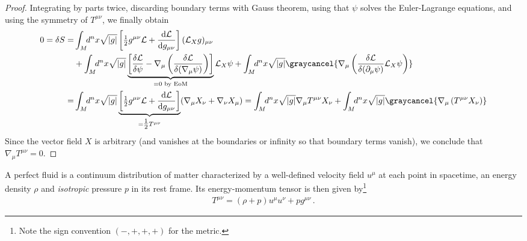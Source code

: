 \begin{proof}
Integrating by parts twice, discarding boundary terms with Gauss theorem, using that $\psi$ solves the Euler-Lagrange equations, and using the symmetry of $T^{\mu\nu}$, we finally obtain
{\small
\begin{align}
0= \delta S = & \int_M \!\!d^nx \sqrt{|g|} \left[ \tfrac{1}{2} g^{\mu\nu} \mathcal{L} + \frac{\mathrm{d} \mathcal{L}}{\mathrm{d} g_{\mu\nu}} \right] (\mathcal{L}_X g)_{\mu\nu}
\\
&+ \int_M \!\!d^nx \sqrt{|g|} \underbrace{\left[ \frac{\delta \mathcal{L}}{\delta \psi} - \nabla_\mu \left( \frac{\delta \mathcal{L}}{\delta (\nabla_\mu \psi)} \right) \right]}_{=0 \text{ by EoM}} \mathcal{L}_X \psi + \int_M \!\!d^nx \sqrt{|g|} \graycancel{\nabla_\mu \left( \frac{\delta \mathcal{L}}{\delta (\partial_\mu \psi)} \mathcal{L}_X \psi \right)}
\\
=& \int_M \!\!d^nx \sqrt{|g|} \underbrace{\left[ \tfrac{1}{2} g^{\mu\nu} \mathcal{L} + \frac{\mathrm{d}\mathcal{L}}{\mathrm{d} g_{\mu\nu}} \right]}_{=\tfrac{1}{2}T^{\mu\nu}} (\nabla_\mu X_\nu + \nabla_\nu X_\mu)
= \int_M\!\! d^nx \sqrt{|g|} \nabla_{\mu}T^{\mu\nu} X_\nu 
+ \int_M \!\!d^nx \sqrt{|g|} \graycancel{\nabla_{\mu}\left(T^{\mu\nu}X_\nu\right)}
\end{align}
}
Since the vector field $X$ is arbitrary (and vanishes at the boundaries or infinity so that boundary terms vanish), we conclude that $\nabla_\mu T^{\mu\nu}=0$.
%
\end{proof}


\begin{mytheorem}
%
A perfect fluid is a continuum distribution of matter characterized by a well-defined velocity field $u^\mu$ at each point in spacetime, an energy density $\rho$ and \emph{isotropic} pressure $p$ in its rest frame.
Its energy-momentum tensor is then given by\footnote{Note the sign convention $(-,+,+,+)$ for the metric.}
\begin{align}
    T^{\mu\nu} = (\rho + p) u^\mu u^\nu + p g^{\mu\nu}\,.
\end{align}
%
\end{mytheorem}

